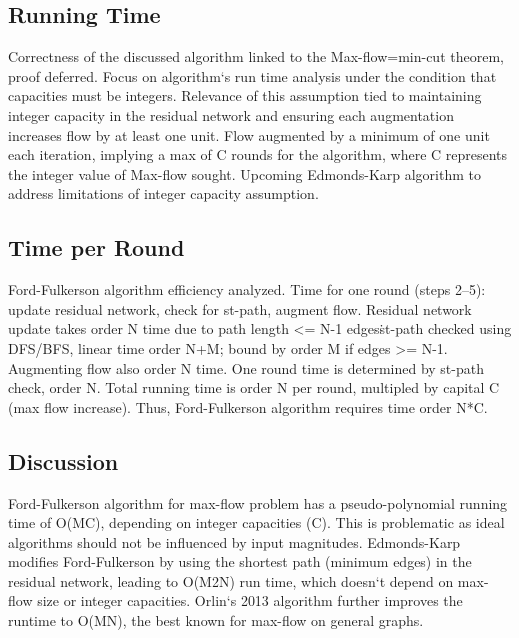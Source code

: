 \subsection*{Running Time}
Correctness of the discussed algorithm linked to the Max-flow=min-cut theorem, proof deferred.
Focus on algorithm`s run time analysis under the condition that capacities must be integers.
Relevance of this assumption tied to maintaining integer capacity in the residual network and ensuring each augmentation increases flow by at least one unit.
Flow augmented by a minimum of one unit each iteration, implying a max of C rounds for the algorithm, where C represents the integer value of Max-flow sought.
Upcoming Edmonds-Karp algorithm to address limitations of integer capacity assumption.

\subsection*{Time per Round}
Ford-Fulkerson algorithm efficiency analyzed.
Time for one round (steps 2--5): update residual network, check for st-path, augment flow.
Residual network update takes order N time due to path length \textless{}= N-1 edges\. st-path checked using DFS/BFS, linear time order N+M; bound by order M if edges \textgreater{}= N-1.
Augmenting flow also order N time.
One round time is determined by st-path check, order N\@.
Total running time is order N per round, multipled by capital C (max flow increase).
Thus, Ford-Fulkerson algorithm requires time order N*C\@.

\subsection*{Discussion}
Ford-Fulkerson algorithm for max-flow problem has a pseudo-polynomial running time of O(MC), depending on integer capacities (C).
This is problematic as ideal algorithms should not be influenced by input magnitudes.
Edmonds-Karp modifies Ford-Fulkerson by using the shortest path (minimum edges) in the residual network, leading to O(M2N) run time, which doesn`t depend on max-flow size or integer capacities.
Orlin`s 2013 algorithm further improves the runtime to O(MN), the best known for max-flow on general graphs.

